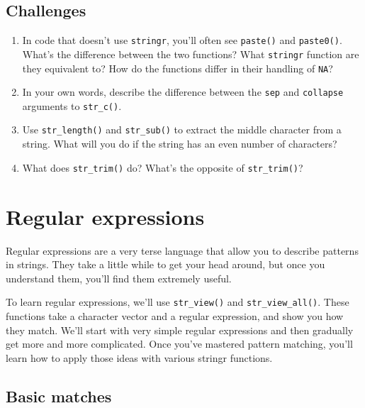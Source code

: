 \documentclass[]{book}
\begin{document}
\hypertarget{challenges-15}{%
\subsection*{Challenges}\label{challenges-15}}

\begin{enumerate}
\def\labelenumi{\arabic{enumi}.}
\item
  In code that doesn't use \texttt{stringr}, you'll often see \texttt{paste()} and \texttt{paste0()}.
  What's the difference between the two functions? What \texttt{stringr} function are
  they equivalent to? How do the functions differ in their handling of
  \texttt{NA}?
\item
  In your own words, describe the difference between the \texttt{sep} and \texttt{collapse}
  arguments to \texttt{str\_c()}.
\item
  Use \texttt{str\_length()} and \texttt{str\_sub()} to extract the middle character from
  a string. What will you do if the string has an even number of characters?
\item
  What does \texttt{str\_trim()} do? What's the opposite of \texttt{str\_trim()}?
\end{enumerate}

\hypertarget{regular-expressions}{%
\section{Regular expressions}\label{regular-expressions}}

Regular expressions are a very terse language that allow you to describe patterns in strings. They take a little while to get your head around, but once you understand them, you'll find them extremely useful.

To learn regular expressions, we'll use \texttt{str\_view()} and \texttt{str\_view\_all()}. These functions take a character vector and a regular expression, and show you how they match. We'll start with very simple regular expressions and then gradually get more and more complicated. Once you've mastered pattern matching, you'll learn how to apply those ideas with various stringr functions.

\hypertarget{basic-matches}{%
\subsection{Basic matches}\label{basic-matches}}
\end{document}
